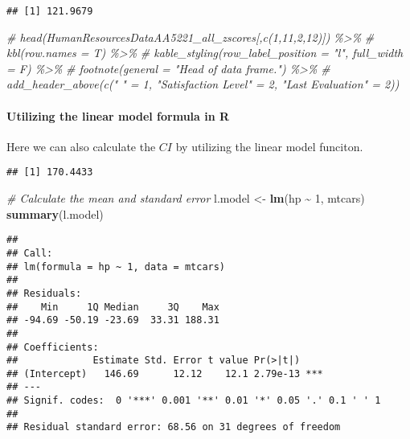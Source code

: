 \documentclass[
]{book}
\newenvironment{Shaded}{\begin{snugshade}}{\end{snugshade}}
\newcommand{\CommentTok}[1]{\textcolor[rgb]{0.56,0.35,0.01}{\textit{#1}}}
\newcommand{\DecValTok}[1]{\textcolor[rgb]{0.00,0.00,0.81}{#1}}
\newcommand{\FloatTok}[1]{\textcolor[rgb]{0.00,0.00,0.81}{#1}}
\newcommand{\FunctionTok}[1]{\textcolor[rgb]{0.13,0.29,0.53}{\textbf{#1}}}
\newcommand{\NormalTok}[1]{#1}
\newcommand{\OtherTok}[1]{\textcolor[rgb]{0.56,0.35,0.01}{#1}}
\newcommand{\SpecialCharTok}[1]{\textcolor[rgb]{0.81,0.36,0.00}{\textbf{#1}}}
\theoremstyle{definition}
\theoremstyle{definition}
\theoremstyle{definition}
\theoremstyle{definition}
\theoremstyle{remark}
\begin{document}
\begin{verbatim}
## [1] 121.9679
\end{verbatim}

\begin{Shaded}
\begin{Highlighting}[]
\CommentTok{\# head(HumanResourcesDataAA5221\_all\_zscores[,c(1,11,2,12)]) \%\textgreater{}\%}
\CommentTok{\#   kbl(row.names = T) \%\textgreater{}\%}
\CommentTok{\#   kable\_styling(row\_label\_position = "l", full\_width = F) \%\textgreater{}\% }
\CommentTok{\#   footnote(general = "Head of data frame.") \%\textgreater{}\% }
\CommentTok{\#   add\_header\_above(c(" " = 1, "Satisfaction Level" = 2, "Last Evaluation" = 2))}
\end{Highlighting}
\end{Shaded}

\hypertarget{utilizing-the-linear-model-formula-in-r}{%
\paragraph{Utilizing the linear model formula in R}\label{utilizing-the-linear-model-formula-in-r}}

Here we can also calculate the \(CI\) by utilizing the linear model funciton.

\begin{Shaded}
\end{Shaded}

\begin{verbatim}
## [1] 170.4433
\end{verbatim}

\begin{Shaded}
\begin{Highlighting}[]
\CommentTok{\# Calculate the mean and standard error}
\NormalTok{l.model }\OtherTok{\textless{}{-}} \FunctionTok{lm}\NormalTok{(hp }\SpecialCharTok{\textasciitilde{}} \DecValTok{1}\NormalTok{, mtcars)}
\FunctionTok{summary}\NormalTok{(l.model)}
\end{Highlighting}
\end{Shaded}

\begin{verbatim}
## 
## Call:
## lm(formula = hp ~ 1, data = mtcars)
## 
## Residuals:
##    Min     1Q Median     3Q    Max 
## -94.69 -50.19 -23.69  33.31 188.31 
## 
## Coefficients:
##             Estimate Std. Error t value Pr(>|t|)    
## (Intercept)   146.69      12.12    12.1 2.79e-13 ***
## ---
## Signif. codes:  0 '***' 0.001 '**' 0.01 '*' 0.05 '.' 0.1 ' ' 1
## 
## Residual standard error: 68.56 on 31 degrees of freedom
\end{verbatim}
\end{document}

